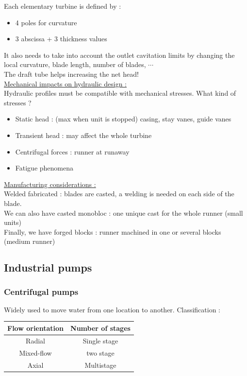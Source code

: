 \documentclass[../main.tex]{subfiles}
\begin{document}
Each elementary turbine is defined by : \begin{itemize}
    \item 4 poles for curvature
    \item 3 abscissa + 3 thickness values
\end{itemize}

It also needs to take into account the outlet cavitation limits by changing the local curvature, blade length, number of blades, $\cdots$\\

The draft tube helps increasing the net head!\\

\quad \underline{Mechanical impacts on hydraulic design :}\\
Hydraulic profiles must be compatible with mechanical stresses. What kind of stresses ? \begin{itemize}
    \item Static head : (max when unit is stopped) casing, stay vanes, guide vanes
    \item Transient head : may affect the whole turbine
    \item Centrifugal forces : runner at runaway
    \item Fatigue phenomena
\end{itemize}

\quad \underline{Manufacturing considerations :}\\
Welded fabricated : blades are casted, a welding is needed on each side of the blade.\\
We can also have casted monobloc : one unique cast for the whole runner (small units)\\
Finally, we have forged blocks : runner machined in one or several blocks (medium runner)

\subsection{Industrial pumps}
\subsubsection{Centrifugal pumps}
Widely used to move water from one location to another. Classification : \begin{table}[hbt!]
    \centering
    \begin{tabular}{c|c}
        Flow orientation & Number of stages \\ \hline
        Radial & Single stage\\
        Mixed-flow & two stage\\
        Axial & Multistage\\
    \end{tabular}
\end{table}
\end{document}
